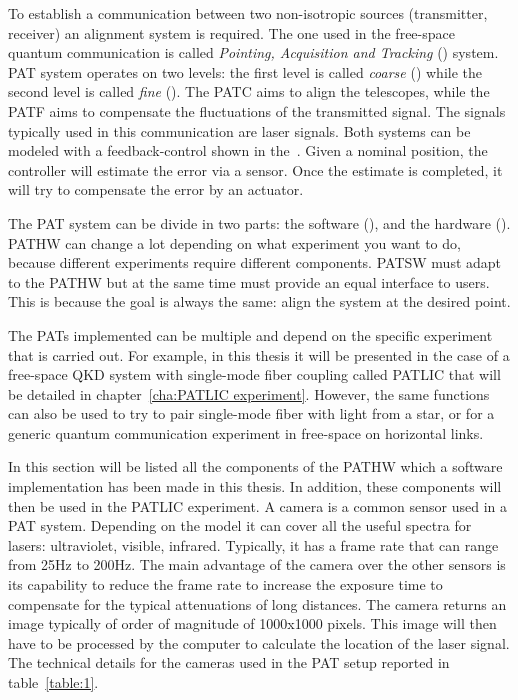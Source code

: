 To establish a communication between two non-isotropic sources (transmitter, receiver) an alignment system is required. The one used in the free-space quantum communication is called \textit{Pointing, Acquisition and Tracking} () system. PAT system operates on two levels: the first level is called \textit{coarse} () while the second level is called \textit{fine} ().
The PATC aims to align the telescopes, while the PATF aims to compensate the fluctuations of the transmitted signal. The signals typically used in this communication are laser signals. Both systems can be modeled with a feedback-control shown in the~.
Given a nominal position, the controller will estimate the error via a sensor. Once the estimate is completed, it will try to compensate the error by an actuator.

The PAT system can be divide in two parts: the software (), and the hardware ().
PATHW can change a lot depending on what experiment you want to do, because different experiments require different components. PATSW must adapt to the PATHW but at the same time must provide an equal interface to users. This is because the goal is always the same: align the system at the desired point.

The PATs implemented can be multiple and depend on the specific experiment that is carried out. For example, in this thesis it will be presented in the case of a free-space QKD system with single-mode fiber coupling called PATLIC that will be detailed in chapter~\ref{cha:PATLIC experiment}. However, the same functions can also be used to try to pair single-mode fiber with light from a star, or for a generic quantum communication experiment in free-space on horizontal links.

In this section will be listed all the components of the PATHW which a software implementation has been made in this thesis. In addition, these components will then be used in the PATLIC experiment.
A camera is a common sensor used in a PAT system. Depending on the model it can cover all the useful spectra for lasers: ultraviolet, visible, infrared.
Typically, it has a frame rate that can range from 25Hz to 200Hz. The main advantage of the camera over the other sensors is its capability to reduce the frame rate to increase the exposure time to compensate for the typical attenuations of long distances.
The camera returns an image typically of order of magnitude of 1000x1000 pixels. This image will then have to be processed by the computer to calculate the location of the laser signal.
The technical details for the cameras used in the PAT setup reported in table~\ref{table:1}.

